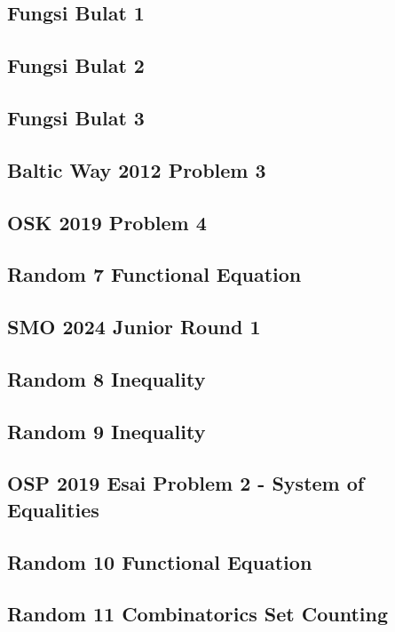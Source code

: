 \subsection{Fungsi Bulat 1}


\subsection{Fungsi Bulat 2}


\subsection{Fungsi Bulat 3}


\subsection{Baltic Way 2012 Problem 3}


\subsection{OSK 2019 Problem 4}


\subsection{Random 7 Functional Equation}


\subsection{SMO 2024 Junior Round 1}


\subsection{Random 8 Inequality}


\subsection{Random 9 Inequality}


\subsection{OSP 2019 Esai Problem 2 - System of Equalities}


\subsection{Random 10 Functional Equation}


\subsection{Random 11 Combinatorics Set Counting}
